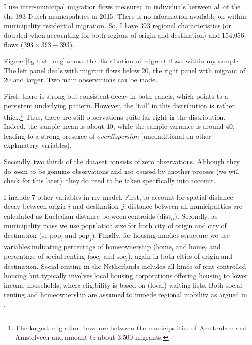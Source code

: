 \documentclass[fleqn,10pt]{SelfArx} %
\begin{document}
        I use inter-municipal migration flows measured in individuals between
        all of the the 393 Dutch municipalities in 2015. There is no information
        available on within municipality residential migration. So,
        I have 393 regional characteristics (or doubled when
        accounting for both regions of origin and destination) and
        154,056 flows ($393 \times 393 - 393$). 

        Figure \ref{fig:hist_mig} shows the distribution of migrant
        flows within my sample. The left panel deals with migrant
        flows below 20, the right panel with migrant of 20 and
        larger. Two main observations can be made.

        First, there is strong but consistent decay in both panels,
        which points to a persistent underlying pattern. However, the
        `tail' in this distribution is rather thick.\footnote{The
          largest migration flows are between the municipalities of
          Amsterdam and Amstelveen and amount to about 3,500
          migrants.} Thus, there are still observations quite far right in
        the distribution. Indeed, the sample mean is about 10, while the
        sample variance is around 40, leading to a strong presence of
        \emph{overdispersion} (unconditional on other explanatory variables).

        Secondly, two thirds of the dataset consists of zero
        observations. Although they do seem to be genuine observations
        and not caused by another process (we will check for this
        later), they do need to be taken specifically into account. 

        I include 7 other variables in my model. First, to account for
        spatial distance decay between origin $i$ and destination $j$,
        distance between all municipalities are calculated as
        Eucledian distance between centroids
        ($\text{dist}_{ij}$). Secondly, as municipality mass we use
        population size for both city of origin and city of destination (so $\text{pop}_i$ and
        $\text{pop}_j$). Finally, for housing market structure we use
        variables indicating percentage of homeownership
        ($\text{home}_i$ and $\text{home}_j$ and percentage of social
        renting ($\text{soc}_i$ and $\text{soc}_j$), again in both cities of origin and destination. Social renting in the Netherlands includes all kinds of rent controlled housing but typically
        involves local housing corporations offering housing to lower
        income households, where eligibility is based on (local) waiting
        lists. Both social renting and homeownership are assumed to
        impede regional mobility as argued in \citep{de2009homeownership}.
\end{document}
